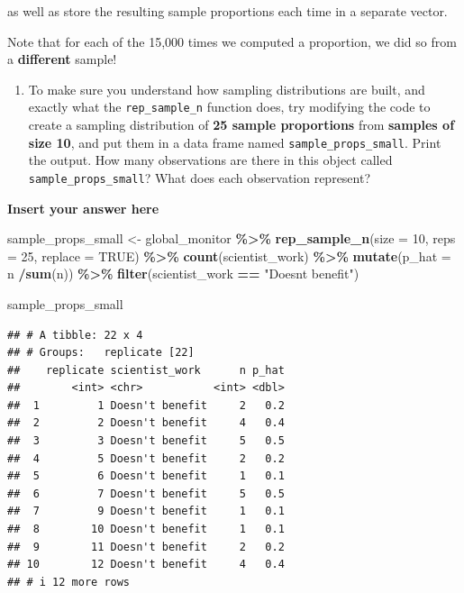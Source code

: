 \documentclass[
]{article}
\newenvironment{Shaded}{\begin{snugshade}}{\end{snugshade}}
\newcommand{\AttributeTok}[1]{\textcolor[rgb]{0.13,0.29,0.53}{#1}}
\newcommand{\ConstantTok}[1]{\textcolor[rgb]{0.56,0.35,0.01}{#1}}
\newcommand{\DecValTok}[1]{\textcolor[rgb]{0.00,0.00,0.81}{#1}}
\newcommand{\FunctionTok}[1]{\textcolor[rgb]{0.13,0.29,0.53}{\textbf{#1}}}
\newcommand{\NormalTok}[1]{#1}
\newcommand{\OtherTok}[1]{\textcolor[rgb]{0.56,0.35,0.01}{#1}}
\newcommand{\SpecialCharTok}[1]{\textcolor[rgb]{0.81,0.36,0.00}{\textbf{#1}}}
\newcommand{\StringTok}[1]{\textcolor[rgb]{0.31,0.60,0.02}{#1}}
\providecommand{\tightlist}{%
  \setlength{\itemsep}{0pt}\setlength{\parskip}{0pt}}
\begin{document}
as well as store the resulting sample proportions each time in a
separate vector.

Note that for each of the 15,000 times we computed a proportion, we did
so from a \textbf{different} sample!

\begin{enumerate}
\def\labelenumi{\arabic{enumi}.}
\setcounter{enumi}{4}
\tightlist
\item
  To make sure you understand how sampling distributions are built, and
  exactly what the \texttt{rep\_sample\_n} function does, try modifying
  the code to create a sampling distribution of \textbf{25 sample
  proportions} from \textbf{samples of size 10}, and put them in a data
  frame named \texttt{sample\_props\_small}. Print the output. How many
  observations are there in this object called
  \texttt{sample\_props\_small}? What does each observation represent?
\end{enumerate}

\textbf{Insert your answer here}

\begin{Shaded}
\begin{Highlighting}[]
\NormalTok{sample\_props\_small }\OtherTok{\textless{}{-}}\NormalTok{ global\_monitor }\SpecialCharTok{\%\textgreater{}\%}
  \FunctionTok{rep\_sample\_n}\NormalTok{(}\AttributeTok{size =} \DecValTok{10}\NormalTok{, }\AttributeTok{reps =} \DecValTok{25}\NormalTok{, }\AttributeTok{replace =} \ConstantTok{TRUE}\NormalTok{) }\SpecialCharTok{\%\textgreater{}\%}
  \FunctionTok{count}\NormalTok{(scientist\_work) }\SpecialCharTok{\%\textgreater{}\%}
  \FunctionTok{mutate}\NormalTok{(}\AttributeTok{p\_hat =}\NormalTok{ n }\SpecialCharTok{/}\FunctionTok{sum}\NormalTok{(n)) }\SpecialCharTok{\%\textgreater{}\%}
  \FunctionTok{filter}\NormalTok{(scientist\_work }\SpecialCharTok{==} \StringTok{"Doesn\textquotesingle{}t benefit"}\NormalTok{)}

\NormalTok{sample\_props\_small}
\end{Highlighting}
\end{Shaded}

\begin{verbatim}
## # A tibble: 22 x 4
## # Groups:   replicate [22]
##    replicate scientist_work      n p_hat
##        <int> <chr>           <int> <dbl>
##  1         1 Doesn't benefit     2   0.2
##  2         2 Doesn't benefit     4   0.4
##  3         3 Doesn't benefit     5   0.5
##  4         5 Doesn't benefit     2   0.2
##  5         6 Doesn't benefit     1   0.1
##  6         7 Doesn't benefit     5   0.5
##  7         9 Doesn't benefit     1   0.1
##  8        10 Doesn't benefit     1   0.1
##  9        11 Doesn't benefit     2   0.2
## 10        12 Doesn't benefit     4   0.4
## # i 12 more rows
\end{verbatim}
\end{document}
